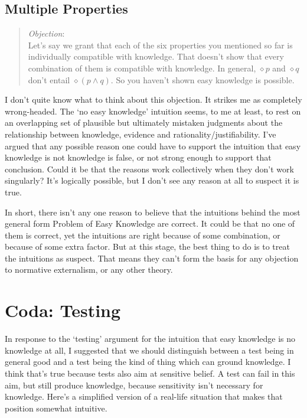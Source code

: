 \subsection{Multiple Properties}
\label{multipleproperties}

\begin{quote}
\emph{Objection}:\\
Let's say we grant that each of the six properties you mentioned so far is individually compatible with knowledge. That doesn't show that every combination of them is compatible with knowledge. In general, $\diamond p$ and $\diamond q$ don't entail $\diamond (p \wedge q)$. So you haven't shown easy knowledge is possible.
\end{quote}
I don't quite know what to think about this objection. It strikes me as completely wrong-headed. The `no easy knowledge' intuition seems, to me at least, to rest on an overlapping set of plausible but ultimately mistaken judgments about the relationship between knowledge, evidence and rationality\slash justifiability. I've argued that any possible reason one could have to support the intuition that easy knowledge is not knowledge is false, or not strong enough to support that conclusion. Could it be that the reasons work collectively when they don't work singularly? It's logically possible, but I don't see any reason at all to suspect it is true.

In short, there isn't any one reason to believe that the intuitions behind the most general form Problem of Easy Knowledge are correct. It could be that no one of them is correct, yet the intuitions are right because of some combination, or because of some extra factor. But at this stage, the best thing to do is to treat the intuitions as suspect. That means they can't form the basis for any objection to normative externalism, or any other theory.

\section{Coda: Testing}
\label{coda:testing}

In response to the `testing' argument for the intuition that easy knowledge is no knowledge at all, I suggested that we should distinguish between a test being in general good and a test being the kind of thing which can ground knowledge. I think that's true because tests also aim at sensitive belief. A test can fail in this aim, but still produce knowledge, because sensitivity isn't necessary for knowledge. Here's a simplified version of a real-life situation that makes that position somewhat intuitive.

